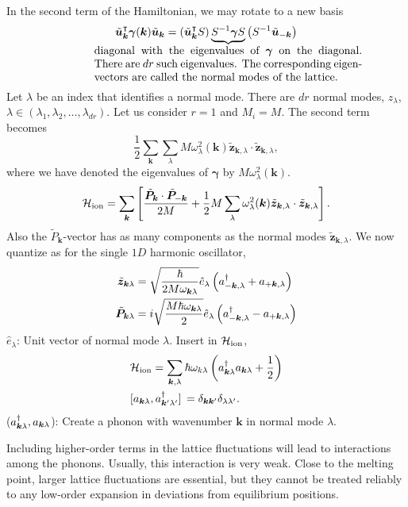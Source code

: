 In the second term of the Hamiltonian, we may rotate to a new basis
\begin{equation}
	\tilde{\bm{u}}_{\bm{k}}^{\intercal}\bm{\gamma}(\bm{k})\tilde{\bm{u}}_{\bm{k}} = \left (\tilde{\bm{u}}_{\bm{k}}^{\intercal}S\right )\underbrace{S^{-1}\bm{\gamma}S}_{\mathclap{\parbox{0.7\textwidth}{diagonal with the eigenvalues of $\bm\gamma$ on the diagonal. There are $dr$ such eigenvalues. The corresponding eigenvectors are called the normal modes of the lattice. }}}\left (S^{-1}\tilde{\bm{u}}_{-\bm{k}}\right )
\end{equation}
Let $\lambda$ be an index that identifies a normal mode. There are $dr$ normal modes, $z_{\lambda}$, $\lambda\in (\lambda_1,\lambda_2,  \dots, \lambda_{dr})$. Let us consider $r = 1$ and $M_i = M$. 
The second term becomes
\begin{equation}
	\frac{1}{2}\sum_{\bm{k}}\sum_{\lambda}M\omega_{\lambda}^{2}(\bm{k}) \tilde{\bm{z}}_{\bm{k},\lambda}\cdot\tilde{\bm{z}}_{\bm{k},\lambda},
\end{equation}
where we have denoted the eigenvalues of $\bm{\gamma}$ by $M\omega_\lambda^2(\bm{k})$.
\begin{equation}
	\mathcal{H}_{\text{ion}} = \sum_{\bm{k}}\left [\frac{\tilde{\bm{P}}_{\bm{k}}\cdot\tilde{\bm{P}}_{-\bm{k}}}{2M} + \frac{1}{2}M\sum_{\lambda}\omega_{\lambda}^{2}(\bm{k})\tilde{\bm{z}}_{\bm{k},\lambda}\cdot\tilde{\bm{z}}_{\bm{k},\lambda}\right ].
\end{equation}
Also the $\tilde{P}_{\bm{k}}$-vector has as many components as the normal modes $\tilde{\bm{z}}_{\bm{k},\lambda}$.
We now quantize as for the single $1D$ harmonic oscillator,
\begin{align}
	\tilde{\bm{z}}_{\bm{k}\lambda} &= \sqrt{\frac{\hbar}{2M\omega_{\bm{k}\lambda}}}\hat{e}_{\lambda}\left (a_{-\bm{k},\lambda}^{\dagger} + a_{+\bm{k},\lambda}\right ) \\
	\tilde{\bm{P}}_{\bm{k}\lambda} &= i\sqrt{\frac{M\hbar\omega_{\bm{k}\lambda}}{2}}\hat{e}_{\lambda}\left (a_{-\bm{k},\lambda}^{\dagger} - a_{+\bm{k},\lambda}\right )
\end{align}
$\hat{e}_{\lambda}$: Unit vector of normal mode $\lambda$. Insert in $\mathcal{H}_{\text{ion}}$, 
\begin{align}
	&\Ha_{\text{ion}} = \sum_{\bm{k},\lambda}\hbar\omega_{k\lambda}\left (a_{\bm{k}\lambda}^{\dg}a_{\bm{k}\lambda} + \frac{1}{2}\right ) \\
 	&\comm*{a_{\bm{k}\lambda}}{a_{\bm{k}'\lambda'}^{\dg}} = \delta_{\bm{k}\bm{k}'}\delta_{\lambda\lambda'}.
\end{align}
($a_{\bm{k}\lambda}^{\dagger}, a_{\bm{k}\lambda}$): Create a phonon with wavenumber $\bm{k}$ in normal mode $\lambda$.

Including higher-order terms in the lattice fluctuations will lead to interactions among the phonons. Usually, this interaction is very weak. Close to the melting point, larger lattice fluctuations are essential, but they cannot be treated reliably to any low-order expansion in deviations from equilibrium positions. 
